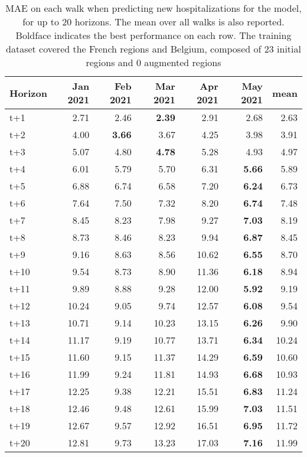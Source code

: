 \begin{table}[H]
\centering
\caption{MAE on each walk when predicting new hospitalizations for the model, for up to 20 horizons. The mean over all walks is also reported. Boldface indicates the best performance on each row. The training dataset covered the French regions and Belgium, composed of 23 initial regions and 0 augmented regions }
\label{tab:MAE_walk_baseline}
\begin{tabular}{lrrrrrr}
\toprule
Horizon &  Jan 2021 &  Feb 2021 &  Mar 2021 &  Apr 2021 &  May 2021 &  mean \\
\midrule
t+1  & 2.71  & 2.46  & \textbf{2.39}  & 2.91  & 2.68  & 2.63  \\
t+2  & 4.00  & \textbf{3.66}  & 3.67  & 4.25  & 3.98  & 3.91  \\
t+3  & 5.07  & 4.80  & \textbf{4.78}  & 5.28  & 4.93  & 4.97  \\
t+4  & 6.01  & 5.79  & 5.70  & 6.31  & \textbf{5.66}  & 5.89  \\
t+5  & 6.88  & 6.74  & 6.58  & 7.20  & \textbf{6.24}  & 6.73  \\
t+6  & 7.64  & 7.50  & 7.32  & 8.20  & \textbf{6.74}  & 7.48  \\
t+7  & 8.45  & 8.23  & 7.98  & 9.27  & \textbf{7.03}  & 8.19  \\
t+8  & 8.73  & 8.46  & 8.23  & 9.94  & \textbf{6.87}  & 8.45  \\
t+9  & 9.16  & 8.63  & 8.56  & 10.62  & \textbf{6.55}  & 8.70  \\
t+10  & 9.54  & 8.73  & 8.90  & 11.36  & \textbf{6.18}  & 8.94  \\
t+11  & 9.89  & 8.88  & 9.28  & 12.00  & \textbf{5.92}  & 9.19  \\
t+12  & 10.24  & 9.05  & 9.74  & 12.57  & \textbf{6.08}  & 9.54  \\
t+13  & 10.71  & 9.14  & 10.23  & 13.15  & \textbf{6.26}  & 9.90  \\
t+14  & 11.17  & 9.19  & 10.77  & 13.71  & \textbf{6.34}  & 10.24  \\
t+15  & 11.60  & 9.15  & 11.37  & 14.29  & \textbf{6.59}  & 10.60  \\
t+16  & 11.99  & 9.24  & 11.81  & 14.93  & \textbf{6.68}  & 10.93  \\
t+17  & 12.25  & 9.38  & 12.21  & 15.51  & \textbf{6.83}  & 11.24  \\
t+18  & 12.46  & 9.48  & 12.61  & 15.99  & \textbf{7.03}  & 11.51  \\
t+19  & 12.67  & 9.57  & 12.92  & 16.51  & \textbf{6.95}  & 11.72  \\
t+20  & 12.81  & 9.73  & 13.23  & 17.03  & \textbf{7.16}  & 11.99  \\

\bottomrule
\end{tabular}
\end{table}
